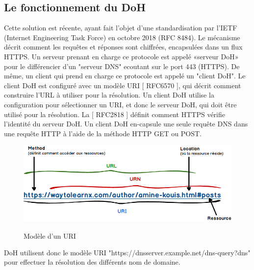 \documentclass[a4paper,12pt]{article}
\begin{document}
	\subsection{Le fonctionnement du DoH}
	Cette solution est récente, ayant fait l’objet d’une standardisation par l’IETF (Internet Engineering Task Force) en octobre 2018 (RFC 8484).  Le mécanisme décrit comment les requêtes et réponses sont chiffrées, encapsulées dans un flux HTTPS.
	Un serveur prenant en charge ce protocole est appelé «serveur DoH» pour
	le différencier d'un "serveur DNS" ecoutant sur le port 443 (HTTPS). 
	De même, un client qui prend en charge ce protocole est appelé un "client DoH".
	Le client DoH est configuré avec un modèle URI [ RFC6570 ], qui
	décrit comment construire l'URL à utiliser pour la résolution.
	Un client DoH utilise la configuration pour sélectionner un URI, et donc le serveur DoH, qui doit être utilisé pour la résolution. La [ RFC2818 ] définit comment	HTTPS vérifie l'identité du serveur DoH.
	Un client DoH en-capsule une seule requête DNS dans une requête HTTP à l'aide de 
	la méthode HTTP GET ou POST.
	\begin{figure}[H]
		\begin{center}
			{\includegraphics[scale=0.5]{Images/difference-entre-uri-et-url.png}}
			\hspace*{12pt}\hbox{\scriptsize {}}
		\end{center}
		\caption{Modèle d'un URI}		 
		
	\end{figure}
	DoH utilisent donc le modèle URI  "https://dnsserver.example.net/dns-query{?dns}" pour effectuer la résolution des différents nom de domaine. 
\end{document}
